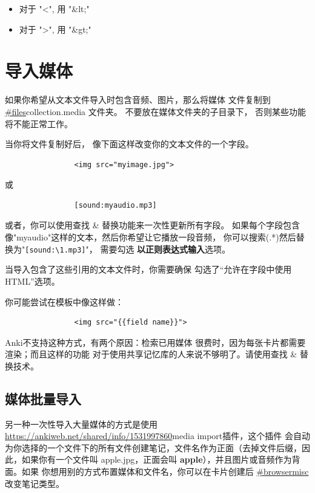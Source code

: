 \documentclass[a4paper]{book}
\newcounter{img}[chapter]
\begin{document}
			\begin{itemize}
				\itemsep1pt\parskip0pt
				\item 对于 "<", 用 "\&lt;"
				\item 对于 ">", 用 "\&gt;"
			\end{itemize}
			\section{导入媒体}
			如果你希望从文本文件导入时包含音频、图片，那么将媒体 文件复制到 \url{#files}collection.media 文件夹。 不要放在媒体文件夹的子目录下，
			否则某些功能将不能正常工作。 
			
			当你将文件复制好后， 像下面这样改变你的文本文件的一个字段。
			
			\begin{shaded}\begin{verbatim}
				<img src="myimage.jpg">
				\end{verbatim}\end{shaded}
			或
			\begin{shaded}\begin{verbatim}
				[sound:myaudio.mp3]
				\end{verbatim}\end{shaded}
			
			或者，你可以使用查找 \& 替换功能来一次性更新所有字段。 如果每个字段包含像"myaudio"这样的文本，然后你希望让它播放一段音频， 你可以搜索(.*)然后替换为"\verb|[sound:\1.mp3]|"， 需要勾选 \textbf{以正则表达式输入}选项。
			
			
			\begin{shaded}
				当导入包含了这些引用的文本文件时，你需要确保 勾选了“允许在字段中使用HTML”选项。
			\end{shaded}
			
			你可能尝试在模板中像这样做：
			\begin{shaded}\begin{verbatim}
				<img src="{{field name}}">
				\end{verbatim}\end{shaded}
			
			Anki不支持这种方式，有两个原因：检索已用媒体 很费时，因为每张卡片都需要渲染；而且这样的功能 对于使用共享记忆库的人来说不够明了。请使用查找 \& 替换技术。
			
			\subsection{媒体批量导入}
			另一种一次性导入大量媒体的方式是使用
			\url{https://ankiweb.net/shared/info/1531997860}media import插件，这个插件 会自动为你选择的一个文件下的所有文件创建笔记，文件名作为正面（去掉文件后缀，因此，如果你有一个文件叫 apple.jpg，正面会叫 \textbf{apple}），并且图片或音频作为背面。如果 你想用别的方式布置媒体和文件名，你可以在卡片创建后
			\url{#browsermisc}改变笔记类型。
\end{document}
